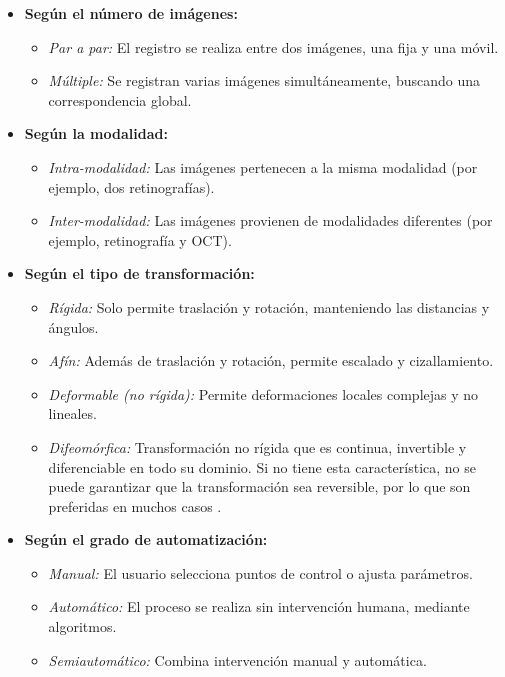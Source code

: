 \begin{itemize}
    \item \textbf{Según el número de imágenes:}
    \begin{itemize}
        \item \textit{Par a par:} El registro se realiza entre dos imágenes, una fija y una móvil.
        \item \textit{Múltiple:} Se registran varias imágenes simultáneamente, buscando una correspondencia global.
    \end{itemize}

    \item \textbf{Según la modalidad:}
    \begin{itemize}
        \item \textit{Intra-modalidad:} Las imágenes pertenecen a la misma modalidad (por ejemplo, dos retinografías).
        \item \textit{Inter-modalidad:} Las imágenes provienen de modalidades diferentes (por ejemplo, retinografía y OCT).
    \end{itemize}

    \item \textbf{Según el tipo de transformación:}
    \begin{itemize}
        \item \textit{Rígida:} Solo permite traslación y rotación, manteniendo las distancias y ángulos.
        \item \textit{Afín:} Además de traslación y rotación, permite escalado y cizallamiento.
        \item \textit{Deformable (no rígida):} Permite deformaciones locales complejas y no lineales.
        \item \textit{Difeomórfica:} Transformación no rígida que es continua, invertible y diferenciable en todo su dominio. Si no tiene esta característica, no se puede garantizar que la transformación sea reversible, por lo que son preferidas en muchos casos \cite{han2022diffeomorphicimageregistrationneural}.
    \end{itemize}

    \item \textbf{Según el grado de automatización:} \cite{deeplernreview3dreg}
    \begin{itemize}
        \item \textit{Manual:} El usuario selecciona puntos de control o ajusta parámetros.
        \item \textit{Automático:} El proceso se realiza sin intervención humana, mediante algoritmos.
        \item \textit{Semiautomático:} Combina intervención manual y automática.
    \end{itemize}


\end{itemize}
